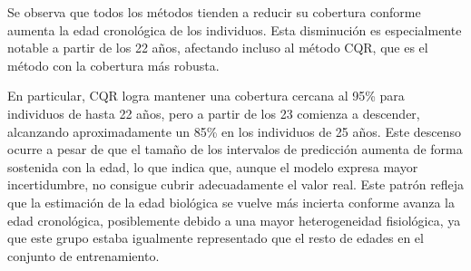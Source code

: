 Se observa que todos los métodos tienden a reducir su cobertura conforme aumenta la edad cronológica de los individuos. Esta disminución es especialmente notable a partir de los 22 años, afectando incluso al método CQR, que es el método con la cobertura más robusta.

En particular, CQR logra mantener una cobertura cercana al 95\% para individuos de hasta 22 años, pero a partir de los 23 comienza a descender, alcanzando aproximadamente un 85\% en los individuos de 25 años. Este descenso ocurre a pesar de que el tamaño de los intervalos de predicción aumenta de forma sostenida con la edad, lo que indica que, aunque el modelo expresa mayor incertidumbre, no consigue cubrir adecuadamente el valor real. Este patrón refleja que la estimación de la edad biológica se vuelve más incierta conforme avanza la edad cronológica, posiblemente debido a una mayor heterogeneidad fisiológica, ya que este grupo estaba igualmente representado que el resto de edades en el conjunto de entrenamiento.


